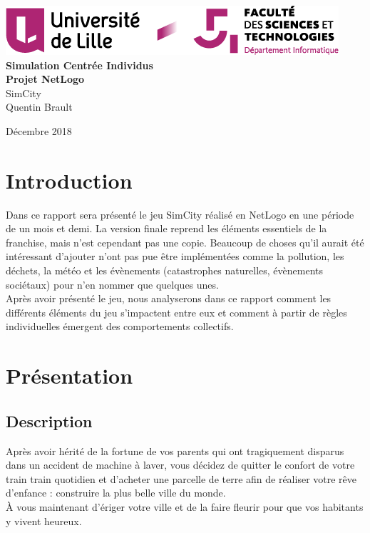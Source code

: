 \documentclass[11pt]{report}
\begin{document}
\begin{titlepage}
	\centering
	\includegraphics[scale=0.8]{logo}\\
	\vspace{5cm}
	{\Huge{ \bf{Simulation Centrée Individus}}}\\
	\vspace{0.5cm}
   	{\Huge{\bf {Projet NetLogo}}}\\
	\vspace{2cm}
   	{\huge{SimCity}}\\
	\vspace{3cm}
   	{\large{Quentin Brault}}
	\vfill
	{\large Décembre 2018\par}
\end{titlepage}

\listoftodos
\newpage

\tableofcontents
\newpage
{}

\chapter*{Introduction}


Dans ce rapport sera présenté le jeu SimCity réalisé en NetLogo en une période de un mois et demi. La version finale reprend les éléments essentiels de la franchise, mais n'est cependant pas une copie.
Beaucoup de choses qu'il aurait été intéressant d'ajouter n'ont pas pue être implémentées comme la pollution, les déchets, la météo et les évènements (catastrophes naturelles, évènements sociétaux) pour n'en nommer que quelques unes.\\
Après avoir présenté le jeu, nous analyserons dans ce rapport comment les différents éléments du jeu s'impactent entre eux et comment à partir de règles individuelles émergent des comportements collectifs.


\chapter{Présentation}

\section{Description}
Après avoir hérité de la fortune de vos parents qui ont tragiquement disparus dans un accident de machine à laver, vous décidez de quitter le confort de votre train train quotidien et d'acheter une parcelle de terre afin de réaliser votre rêve d'enfance : construire la plus belle ville du monde.\\
À vous maintenant d'ériger votre ville et de la faire fleurir pour que vos habitants y vivent heureux.
\end{document}
